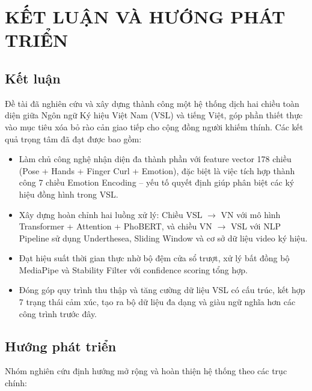 
 
\chapter{KẾT LUẬN VÀ HƯỚNG PHÁT TRIỂN}
 
\section{Kết luận}
 
Đề tài đã nghiên cứu và xây dựng thành công một hệ thống dịch hai chiều toàn diện giữa Ngôn ngữ Ký hiệu Việt Nam (VSL) và tiếng Việt, góp phần thiết thực vào mục tiêu xóa bỏ rào cản giao tiếp cho cộng đồng người khiếm thính. Các kết quả trọng tâm đã đạt được bao gồm:
 
\begin{itemize}
    \item Làm chủ công nghệ nhận diện đa thành phần với feature vector 178 chiều (Pose + Hands + Finger Curl + Emotion), đặc biệt là việc tích hợp thành công 7 chiều Emotion Encoding -- yếu tố quyết định giúp phân biệt các ký hiệu đồng hình trong VSL.
 
    \item Xây dựng hoàn chỉnh hai luồng xử lý: Chiều VSL $\rightarrow$ VN với mô hình Transformer + Attention + PhoBERT, và chiều VN $\rightarrow$ VSL với NLP Pipeline sử dụng Underthesea, Sliding Window và cơ sở dữ liệu video ký hiệu.
 
    \item Đạt hiệu suất thời gian thực nhờ bộ đệm cửa sổ trượt, xử lý bất đồng bộ MediaPipe và Stability Filter với confidence scoring tổng hợp.
 
    \item Đóng góp quy trình thu thập và tăng cường dữ liệu VSL có cấu trúc, kết hợp 7 trạng thái cảm xúc, tạo ra bộ dữ liệu đa dạng và giàu ngữ nghĩa hơn các công trình trước đây.
\end{itemize}
 
\section{Hướng phát triển}
 
Nhóm nghiên cứu định hướng mở rộng và hoàn thiện hệ thống theo các trục chính:
 
